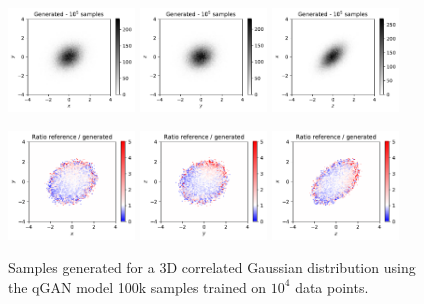 \documentclass[twocolumn,preprintnumbers,superscriptaddress]{revtex4-2}
\begin{document}
\begin{figure}
  \includegraphics[width=0.3\textwidth]{plots/3Dgaussian_posdef/1-2_FAKE_100k.pdf}%
  \includegraphics[width=0.3\textwidth]{plots/3Dgaussian_posdef/2-3_FAKE_100k.pdf}%
  \includegraphics[width=0.3\textwidth]{plots/3Dgaussian_posdef/3-1_FAKE_100k.pdf}

  \includegraphics[width=0.3\textwidth]{plots/3Dgaussian_posdef/1-2_RATIO_100k.pdf}%
  \includegraphics[width=0.3\textwidth]{plots/3Dgaussian_posdef/2-3_RATIO_100k.pdf}%
  \includegraphics[width=0.3\textwidth]{plots/3Dgaussian_posdef/3-1_RATIO_100k.pdf}

  \caption{\label{fig:3dgauss}Samples generated for a 3D correlated Gaussian
    distribution using the qGAN model 100k samples trained on $10^4$ data
    points.}
\end{figure}
\end{document}
